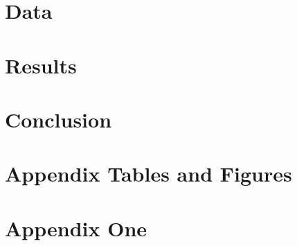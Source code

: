 \documentclass[12pt]{article}
\begin{document}
\section{Data
\label{sec:data}}

\section{Results
\label{sec:results}}

\section{Conclusion\
\label{sec:conclusion}}

\clearpage
\begin{singlespace}
%
%


\end{singlespace}


\newpage
\appendix
\setcounter{table}{0}
\renewcommand{\tablename}{Appendix Table}
\renewcommand{\figurename}{Appendix Figure}
\renewcommand{\thetable}{A\arabic{table}}
\setcounter{figure}{0}
\renewcommand{\thefigure}{A\arabic{figure}}

\section{Appendix Tables and Figures}


\newpage


\newpage 
\section{Appendix One \label{sec:appendix:first}}
\renewcommand{\thetable}{B\arabic{table}}
\setcounter{table}{0}
\renewcommand{\thefigure}{B\arabic{figure}}
\setcounter{figure}{0}
\end{document}
